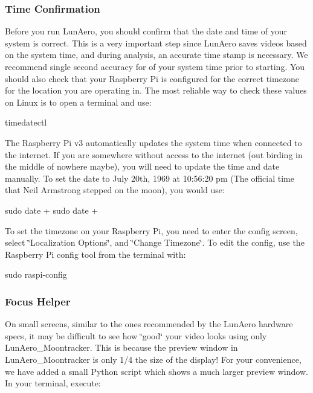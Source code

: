 \subsubsection*{Time Confirmation}

Before you run Lun\+Aero, you should confirm that the date and time of your system is correct. This is a very important step since Lun\+Aero saves videos based on the system time, and during analysis, an accurate time stamp is necessary. We recommend single second accuracy for of your system time prior to starting. You should also check that your Raspberry Pi is configured for the correct timezone for the location you are operating in. The most reliable way to check these values on Linux is to open a terminal and use\+:


\begin{DoxyCode}
timedatectl
\end{DoxyCode}


The Raspberry Pi v3 automatically updates the system time when connected to the internet. If you are somewhere without access to the internet (out birding in the middle of nowhere maybe), you will need to update the time and date manually. To set the date to July 20th, 1969 at 10\+:56\+:20 pm (The official time that Neil Armstrong stepped on the moon), you would use\+:


\begin{DoxyCode}
sudo date +%
sudo date +%
\end{DoxyCode}


To set the timezone on your Raspberry Pi, you need to enter the config screen, select \char`\"{}\+Localization Options\char`\"{}, and \char`\"{}\+Change Timezone\char`\"{}. To edit the config, use the Raspberry Pi config tool from the terminal with\+:


\begin{DoxyCode}
sudo raspi-config
\end{DoxyCode}


\subsubsection*{Focus Helper}

On small screens, similar to the ones recommended by the Lun\+Aero hardware specs, it may be difficult to see how \char`\"{}good\char`\"{} your video looks using only {\ttfamily Lun\+Aero\+\_\+\+Moontracker}. This is because the preview window in {\ttfamily Lun\+Aero\+\_\+\+Moontracker} is only 1/4 the size of the display! For your convenience, we have added a small Python script which shows a much larger preview window. In your terminal, execute\+:


